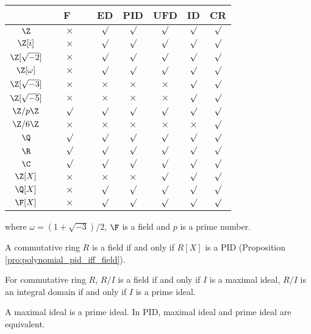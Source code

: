 \begin{center}
\begin{tabular}{ccccccc}
\hline
 & \ \ F\ \ \  & ED & PID & UFD & ID & CR\\\hline %
$\Z$ & $\times$ & $\surd$ & $\surd$ & $\surd$ & $\surd$ & $\surd$\\
$\Z[i]$ & $\times$ & $\surd$ & $\surd$ & $\surd$ & $\surd$ & $\surd$\\
$\Z[\sqrt{-2}]$ & $\times$ & $\surd$ & $\surd$ & $\surd$ & $\surd$ & $\surd$\\
$\Z[\omega]$ & $\times$ & $\surd$ & $\surd$ & $\surd$ & $\surd$ & $\surd$\\
$\Z[\sqrt{-3}]$ & $\times$ & $\times$ & $\times$ & $\times$ & $\surd$ & $\surd$ \\
$\Z[\sqrt{-5}]$ & $\times$ & $\times$ & $\times$ & $\times$ & $\surd$ & $\surd$  \\
$\Z/p\Z$ & $\surd $& $\surd$ & $\surd$ & $\surd$ & $\surd$ & $\surd$\\
$\Z/6\Z$ & $\times$ & $\times$ & $\times$ & $\times$ & $\times$ & $\surd$ \\
$\Q$ & $\surd$ & $\surd$ & $\surd$ & $\surd$ & $\surd$ & $\surd$\\
$\R$ & $\surd$ & $\surd$ & $\surd$ & $\surd$ & $\surd$ & $\surd$\\
$\C$ & $\surd$ & $\surd$ & $\surd$ & $\surd$ & $\surd$ & $\surd$\\
$\Z[X]$ & $\times$ & $\times$ & $\times$ & $\surd$ & $\surd$ & $\surd$\\
$\Q[X]$ & $\times$ & $\surd$ & $\surd$ & $\surd$ & $\surd$ & $\surd$ \\
$\F[X]$ & $\times$ & $\surd$ & $\surd$ & $\surd$ & $\surd$ & $\surd$ \\
\hline
\end{tabular}
\end{center}

where $\omega = (1+\sqrt{-3})/2$, $\F$ is a field and $p$ is a prime number.

A commutative ring $R$ is a field if and only if $R[X]$ is a PID (Proposition \ref{pro:polynomial_pid_iff_field}).

For commutative ring $R$, $R/I$ is a field if and only if $I$ is a maximal ideal, $R/I$ is an integral domain if and only if $I$ is a prime ideal.

A maximal ideal is a prime ideal. In PID, maximal ideal and prime ideal are equivalent.

